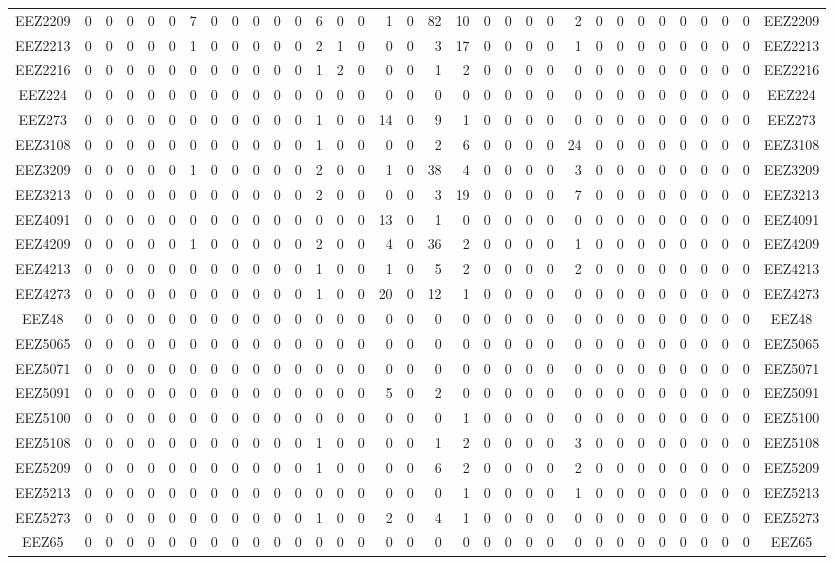 \documentclass[10pt,a4paper,twoside]{report}
\begin{document}
{\begin{tabular}{crrrrrrrrrrrrrrrrrrrrrrrrrrrrrrrc}
EEZ2209&0&0&0&0&0&7&0&0&0&0&0&6&0&0&1&0&82&10&0&0&0&0&2&0&0&0&0&0&0&0&0&EEZ2209\\
EEZ2213&0&0&0&0&0&1&0&0&0&0&0&2&1&0&0&0&3&17&0&0&0&0&1&0&0&0&0&0&0&0&0&EEZ2213\\
EEZ2216&0&0&0&0&0&0&0&0&0&0&0&1&2&0&0&0&1&2&0&0&0&0&0&0&0&0&0&0&0&0&0&EEZ2216\\
EEZ224&0&0&0&0&0&0&0&0&0&0&0&0&0&0&0&0&0&0&0&0&0&0&0&0&0&0&0&0&0&0&0&EEZ224\\
EEZ273&0&0&0&0&0&0&0&0&0&0&0&1&0&0&14&0&9&1&0&0&0&0&0&0&0&0&0&0&0&0&0&EEZ273\\
EEZ3108&0&0&0&0&0&0&0&0&0&0&0&1&0&0&0&0&2&6&0&0&0&0&24&0&0&0&0&0&0&0&0&EEZ3108\\
EEZ3209&0&0&0&0&0&1&0&0&0&0&0&2&0&0&1&0&38&4&0&0&0&0&3&0&0&0&0&0&0&0&0&EEZ3209\\
EEZ3213&0&0&0&0&0&0&0&0&0&0&0&2&0&0&0&0&3&19&0&0&0&0&7&0&0&0&0&0&0&0&0&EEZ3213\\
EEZ4091&0&0&0&0&0&0&0&0&0&0&0&0&0&0&13&0&1&0&0&0&0&0&0&0&0&0&0&0&0&0&0&EEZ4091\\
EEZ4209&0&0&0&0&0&1&0&0&0&0&0&2&0&0&4&0&36&2&0&0&0&0&1&0&0&0&0&0&0&0&0&EEZ4209\\
EEZ4213&0&0&0&0&0&0&0&0&0&0&0&1&0&0&1&0&5&2&0&0&0&0&2&0&0&0&0&0&0&0&0&EEZ4213\\
EEZ4273&0&0&0&0&0&0&0&0&0&0&0&1&0&0&20&0&12&1&0&0&0&0&0&0&0&0&0&0&0&0&0&EEZ4273\\
EEZ48&0&0&0&0&0&0&0&0&0&0&0&0&0&0&0&0&0&0&0&0&0&0&0&0&0&0&0&0&0&0&0&EEZ48\\
EEZ5065&0&0&0&0&0&0&0&0&0&0&0&0&0&0&0&0&0&0&0&0&0&0&0&0&0&0&0&0&0&0&0&EEZ5065\\
EEZ5071&0&0&0&0&0&0&0&0&0&0&0&0&0&0&0&0&0&0&0&0&0&0&0&0&0&0&0&0&0&0&0&EEZ5071\\
EEZ5091&0&0&0&0&0&0&0&0&0&0&0&0&0&0&5&0&2&0&0&0&0&0&0&0&0&0&0&0&0&0&0&EEZ5091\\
EEZ5100&0&0&0&0&0&0&0&0&0&0&0&0&0&0&0&0&0&1&0&0&0&0&0&0&0&0&0&0&0&0&0&EEZ5100\\
EEZ5108&0&0&0&0&0&0&0&0&0&0&0&1&0&0&0&0&1&2&0&0&0&0&3&0&0&0&0&0&0&0&0&EEZ5108\\
EEZ5209&0&0&0&0&0&0&0&0&0&0&0&1&0&0&0&0&6&2&0&0&0&0&2&0&0&0&0&0&0&0&0&EEZ5209\\
EEZ5213&0&0&0&0&0&0&0&0&0&0&0&0&0&0&0&0&0&1&0&0&0&0&1&0&0&0&0&0&0&0&0&EEZ5213\\
EEZ5273&0&0&0&0&0&0&0&0&0&0&0&1&0&0&2&0&4&1&0&0&0&0&0&0&0&0&0&0&0&0&0&EEZ5273\\
EEZ65&0&0&0&0&0&0&0&0&0&0&0&0&0&0&0&0&0&0&0&0&0&0&0&0&0&0&0&0&0&0&0&EEZ65\\

\end{tabular}}
\end{document}

